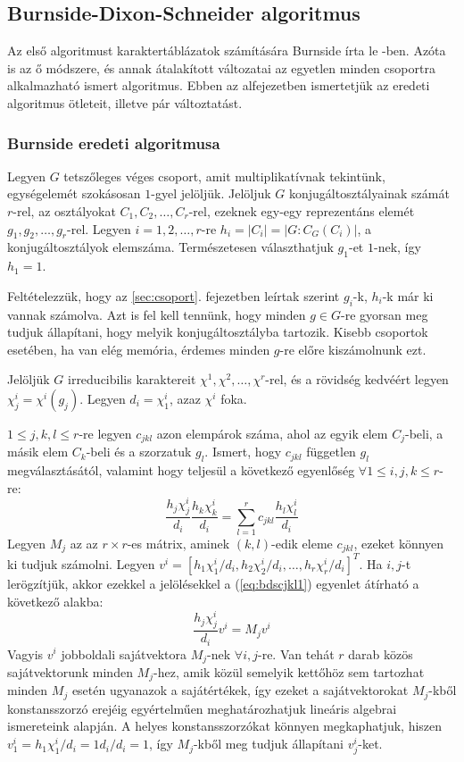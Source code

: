\subsection{Burnside-Dixon-Schneider algoritmus}
\label{subsec:bds}
Az első algoritmust karaktertáblázatok számítására Burnside írta le \cite{Bur11}-ben. Azóta is az ő módszere, és annak átalakított változatai
az egyetlen minden csoportra alkalmazható ismert algoritmus.
Ebben az alfejezetben ismertetjük az eredeti algoritmus ötleteit, illetve pár változtatást.

\subsubsection{Burnside eredeti algoritmusa}
\label{subsubsec:bdseredeti}
Legyen $G$ tetszőleges véges csoport, amit multiplikatívnak tekintünk, egységelemét szokásosan $1$-gyel jelöljük.
Jelöljuk $G$ konjugáltosztályainak számát $r$-rel, az osztályokat $C_1, C_2, \dots, C_r$-rel, ezeknek egy-egy reprezentáns elemét $g_1, g_2, \dots, g_r$-rel.
Legyen $i=1, 2, \dots, r$-re $h_i=|C_i|=|G:C_G(C_i)|$, a konjugáltosztályok elemszáma.
Természetesen választhatjuk $g_1$-et $1$-nek, így $h_1=1$.

Feltételezzük, hogy az \ref{sec:csoport}. fejezetben leírtak szerint $g_i$-k, $h_i$-k már ki vannak számolva.
Azt is fel kell tennünk, hogy minden $g\in G$-re gyorsan meg tudjuk állapítani, hogy melyik konjugáltosztályba tartozik.
Kisebb csoportok esetében, ha van elég memória, érdemes minden $g$-re előre kiszámolnunk ezt.

Jelöljük $G$ irreducibilis karaktereit $\chi^1, \chi^2, \dots, \chi^r$-rel, és a rövidség kedvéért legyen $\chi^i_j=\chi^i(g_j)$.
Legyen $d_i=\chi^i_1$, azaz $\chi^i$ foka.

$1 \le j, k, l \le r$-re legyen $c_{jkl}$ azon elempárok száma, ahol az egyik elem $C_j$-beli, a másik elem $C_k$-beli és a szorzatuk $g_l$.
Ismert, hogy $c_{jkl}$ független $g_l$ megválasztásától, valamint hogy teljesül a következő egyenlőség $\forall 1 \le i, j, k \le r$-re:
\begin{equation}
\label{eq:bdscjkl1}
\frac{h_j\chi^i_j}{d_i}\frac{h_k\chi^i_k}{d_i}=\sum_{l=1}^r c_{jkl}\frac{h_l\chi^i_l}{d_i}
\end{equation}
Legyen $M_j$ az az $r\times r$-es mátrix, aminek $(k,l)$-edik eleme $c_{jkl}$, ezeket könnyen ki tudjuk számolni.
Legyen $v^i=[h_1\chi^i_1/d_i, h_2\chi^i_2/d_i, \dots, h_r\chi^i_r/d_i]^T$.
Ha $i, j$-t lerögzítjük, akkor ezekkel a jelölésekkel a (\ref{eq:bdscjkl1}) egyenlet átírható a következő alakba:
\begin{equation}
\label{eq:bdscjkl2}
\frac{h_j\chi^i_j}{d_i}v^i=M_j v^i
\end{equation}
Vagyis $v^i$ jobboldali sajátvektora $M_j$-nek $\forall i, j$-re.
Van tehát $r$ darab közös sajátvektorunk minden $M_j$-hez, amik közül semelyik kettőhöz sem tartozhat minden $M_j$ esetén ugyanazok a sajátértékek,
így ezeket a sajátvektorokat $M_j$-kből konstansszorzó erejéig egyértelműen meghatározhatjuk lineáris algebrai ismereteink alapján.
A helyes konstansszorzókat könnyen megkaphatjuk, hiszen $v^i_1=h_1\chi^i_1/d_i=1 d_i/d_i=1$, így $M_j$-kből meg tudjuk állapítani $v^i_j$-ket.

